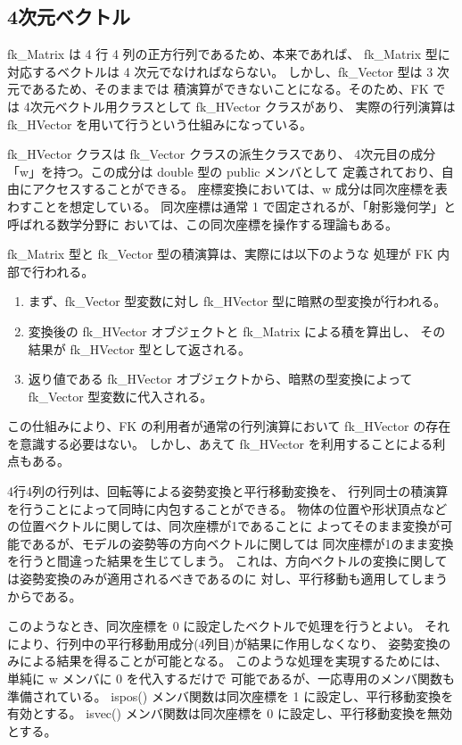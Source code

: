 \subsection{4次元ベクトル}
fk\_Matrix は 4 行 4 列の正方行列であるため、本来であれば、
fk\_Matrix 型に対応するベクトルは 4 次元でなければならない。
しかし、fk\_Vector 型は 3 次元であるため、そのままでは
積演算ができないことになる。そのため、FK では
4次元ベクトル用クラスとして fk\_HVector クラスがあり、
実際の行列演算は fk\_HVector を用いて行うという仕組みになっている。

fk\_HVector クラスは fk\_Vector クラスの派生クラスであり、
4次元目の成分「w」を持つ。この成分は double 型の public メンバとして
定義されており、自由にアクセスすることができる。
座標変換においては、w 成分は同次座標を表わすことを想定している。
同次座標は通常 1 で固定されるが、「射影幾何学」と呼ばれる数学分野に
おいては、この同次座標を操作する理論もある。

fk\_Matrix 型と fk\_Vector 型の積演算は、実際には以下のような
処理が FK 内部で行われる。
\begin{enumerate}
 \item まず、fk\_Vector 型変数に対し fk\_HVector 型に暗黙の型変換が行われる。
 \item 変換後の fk\_HVector オブジェクトと fk\_Matrix による積を算出し、
	その結果が fk\_HVector 型として返される。
 \item 返り値である fk\_HVector オブジェクトから、暗黙の型変換によって
	fk\_Vector 型変数に代入される。
\end{enumerate}
この仕組みにより、FK の利用者が通常の行列演算において
fk\_HVector の存在を意識する必要はない。
しかし、あえて fk\_HVector を利用することによる利点もある。

4行4列の行列は、回転等による姿勢変換と平行移動変換を、
行列同士の積演算を行うことによって同時に内包することができる。
物体の位置や形状頂点などの位置ベクトルに関しては、同次座標が1であることに
よってそのまま変換が可能であるが、モデルの姿勢等の方向ベクトルに関しては
同次座標が1のまま変換を行うと間違った結果を生じてしまう。
これは、方向ベクトルの変換に関しては姿勢変換のみが適用されるべきであるのに
対し、平行移動も適用してしまうからである。

このようなとき、同次座標を 0 に設定したベクトルで処理を行うとよい。
それにより、行列中の平行移動用成分(4列目)が結果に作用しなくなり、
姿勢変換のみによる結果を得ることが可能となる。
このような処理を実現するためには、単純に w メンバに 0 を代入するだけで
可能であるが、一応専用のメンバ関数も準備されている。
ispos() メンバ関数は同次座標を 1 に設定し、平行移動変換を有効とする。
isvec() メンバ関数は同次座標を 0 に設定し、平行移動変換を無効とする。

